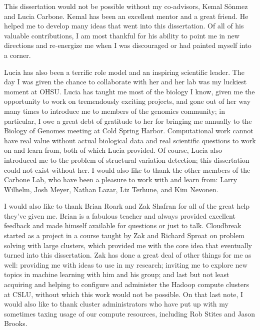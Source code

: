 \documentclass [11pt] {report}
\newcommand{\ignore}[1]{}
\begin{document}
\ignore{\prefacesection{Dedication}
\vfill
\begin{center}
\end{center}
\vfill
}
%
\vfill
\indent This dissertation would not be possible without my co-advisors, Kemal S\"onmez and Lucia Carbone. Kemal has been an excellent mentor and a great friend. He helped me to develop many ideas that went into this dissertation. Of all of his valuable contributions, I am most thankful for his ability to point me in new directions and re-energize me when I was discouraged or had painted myself into a corner. 

Lucia has also been a terrific role model and an inspiring scientific leader. The day I was given the chance to collaborate with her and her lab was my luckiest moment at OHSU. Lucia has taught me most of the biology I know, given me the opportunity to work on tremendously exciting projects, and gone out of her way many times to introduce me to members of the genomics community; in particular, I owe a great debt of gratitude to her for bringing me annually to the Biology of Genomes meeting at Cold Spring Harbor. Computational work cannot have real value without actual biological data and real scientific questions to work on and learn from, both of which Lucia provided. Of course, Lucia also introduced me to the problem of structural variation detection; this dissertation could not exist without her. I would also like to thank the other members of the Carbone Lab, who have been a pleasure to work with and learn from: Larry Wilhelm, Josh Meyer, Nathan Lazar, Liz Terhune, and Kim Nevonen.

I would also like to thank Brian Roark and Zak Shafran for all of the great help they've given me. Brian is a fabulous teacher and always provided excellent feedback and made himself available for questions or just to talk. Cloudbreak started as a project in a course taught by Zak and Richard Sproat on problem solving with large clusters, which provided me with the core idea that eventually turned into this dissertation. Zak has done a great deal of other things for me as well: providing me with ideas to use in my research; inviting me to explore new topics in machine learning with him and his group; and last but not least acquiring and helping to configure and administer the Hadoop compute clusters at CSLU, without which this work would not be possible. On that last note, I would also like to thank cluster administrators who have put up with my sometimes taxing usage of our compute resources, including Rob Stites and Jason Brooks.
\end{document}
